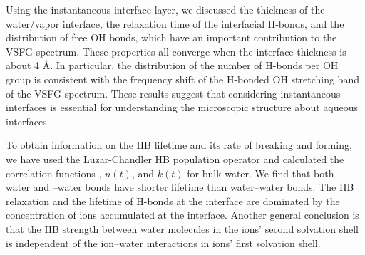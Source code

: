 Using the instantaneous interface layer, we discussed
the thickness of the water/vapor interface, the relaxation time of the interfacial H-bonds, 
and the distribution of free OH bonds, which have an important contribution to the VSFG spectrum.
These properties all converge when the interface thickness is about 4 \AA. 
In particular, the distribution of the number of H-bonds per OH group is consistent with the frequency shift of the H-bonded OH stretching band of the VSFG spectrum. 
These results suggest that considering instantaneous interfaces is essential for understanding the microscopic structure about aqueous interfaces.

To obtain information on the HB lifetime and its rate of breaking and forming, we have used the Luzar-Chandler HB population operator and calculated the correlation functions \CHB, $n(t)$, and $k(t)$ for bulk water. 
We find that both \nitrate--water and \I--water bonds have shorter lifetime than water--water bonds.
The HB relaxation and the lifetime of H-bonds
at the interface are dominated by the concentration of ions accumulated at the interface. 
Another general conclusion is that the HB strength between water molecules in the ions' second solvation shell is independent 
of the ion--water interactions in ions' first solvation shell.

